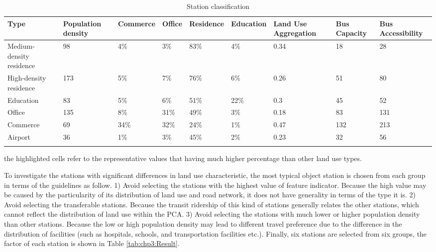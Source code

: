 \begin{sidewaystable}[htbp]
	\centering
	\caption{Station classification}
	\label{tab:chp3:StationClassification}
	\small
	\renewcommand{\arraystretch}{1.25} %
	\begin{tabular}{p{12em}<{\centering}p{4em}<{\centering}p{4em}<{\centering}p{4em}<{\centering}p{4em}<{\centering}p{4em}<{\centering}p{5em}<{\centering}p{5em}<{\centering}p{5em}<{\centering}}
		
		\Xhline{1.5pt}
		Type & Population density & Commerce & Office & Residence & Education & Land Use Aggregation & Bus Capacity & Bus Accessibility \\
		\midrule
		
		Medium-density residence & 98 & 4\% & 3\% & \cellcolor[rgb]{.8, .8, .8} 83\% & 4\% & 0.34 & 18 & 28 \\
		High-density residence & 173 & 5\% & 7\% & \cellcolor[rgb]{.8, .8, .8} 76\% & 6\% & 0.26 & 51 & 80 \\
		Education & 83 & 5\% & 6\% & 51\% & \cellcolor[rgb]{.8, .8, .8} 22\% & 0.3 & 45 & 52 \\
		Office & 135 & 8\% & \cellcolor[rgb]{.8, .8, .8} 31\% & 49\% & 3\% & 0.18 & 83 & 131 \\
		Commerce & 69 & \cellcolor[rgb]{.8, .8, .8} 34\% & \cellcolor[rgb]{.8, .8, .8} 32\% & 24\% & 1\% & 0.47 & 132 & 213 \\
		Airport & 36 & 1\% & 3\% & 45\% & 2\% & 0.23 & 32 & 56 \\
		\Xhline{1.5pt}
		
	\end{tabular}
	\begin{description}
		\normalsize
		\label{note:tab:chp3:StationClassification}
		\item[Note:] the highlighted cells refer to the representative values that having much higher percentage than other land use types.
	\end{description}
	
\end{sidewaystable}

%
To investigate the stations with significant differences in land use characteristic, the most typical object station is chosen from each group in terms of the guidelines as follow. 1) Avoid selecting the stations with the highest value of feature indicator. Because the high value may be caused by the particularity of its distribution of land use and road network, it does not have generality in terms of the type it is. 2) Avoid selecting the transferable stations. Because the transit ridership of this kind of stations generally relates the other stations, which cannot reflect the distribution of land use within the PCA. 3) Avoid selecting the stations with much lower or higher population density than other stations. Because the low or high population density may lead to different travel preference due to the difference in the distribution of facilities (such as hospitals, schools, and transportation facilities etc.). Finally, six stations are selected from six groups, the factor of each station is shown in Table \ref{tab:chp3:Result}.

